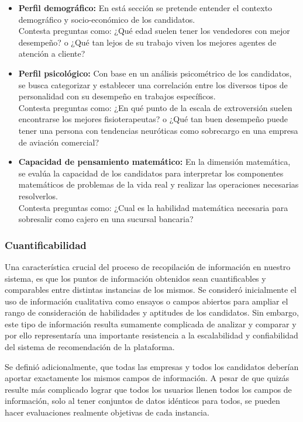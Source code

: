 			\begin{itemize}
			\item \textbf{Perfil demográfico:} En está sección se pretende entender el contexto demográfico y socio-económico de los candidatos. \\
			Contesta preguntas como: ¿Qué edad suelen tener los vendedores con mejor desempeño? o ¿Qué tan lejos de su trabajo viven los mejores agentes de atención a cliente?  
			\item \textbf{Perfil psicológico:} Con base en un análisis psicométrico de los candidatos, se busca categorizar y establecer una correlación entre los diversos tipos de personalidad con su desempeño en trabajos específicos. \\Contesta preguntas como: ¿En qué punto de la escala de extroversión suelen encontrarse los mejores fisioterapeutas? o ¿Qué tan buen desempeño puede tener una persona con tendencias neuróticas como sobrecargo en una empresa de aviación comercial?
			\item \textbf{Capacidad de pensamiento matemático:} En la dimensión matemática, se evalúa la capacidad de los candidatos para interpretar los componentes matemáticos de problemas de la vida real y realizar las operaciones necesarias resolverlos. \\ 
			Contesta preguntas como: ¿Cual es la habilidad matemática necesaria para sobresalir como cajero en una sucursal bancaria?
			\end{itemize}
		\subsubsection{Cuantificabilidad}
			Una característica crucial del proceso de recopilación de información en nuestro sistema, es que los puntos de información obtenidos sean cuantificables y comparables entre distintas instancias de los mismos. Se consideró inicialmente el uso de información cualitativa como ensayos o campos abiertos para ampliar el rango de consideración de habilidades y aptitudes de los candidatos. Sin embargo, este tipo de información resulta sumamente complicada de analizar y comparar y por ello representaría una importante resistencia a la escalabilidad y confiabilidad del sistema de recomendación de la plataforma.

			Se definió adicionalmente, que todas las empresas y todos los candidatos deberían aportar exactamente los mismos campos de información. A pesar de que quizás resulte más complicado lograr que todos los usuarios llenen todos los campos de información, solo al tener conjuntos de datos idénticos para todos, se pueden hacer evaluaciones realmente objetivas de cada instancia.
		
